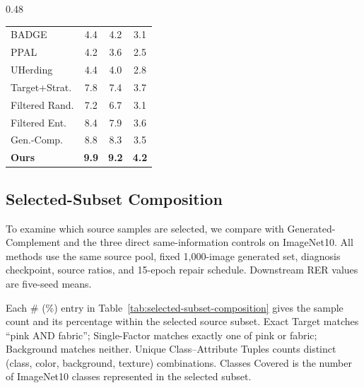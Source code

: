 \begin{table}[t]
\begin{subtable}[t]{0.48\linewidth}
\begin{tabular}{l c c c}
BADGE & 4.4 & 4.2 & 3.1 \\
PPAL & 4.2 & 3.6 & 2.5 \\
UHerding & 4.4 & 4.0 & 2.8 \\
Target+Strat. & 7.8 & 7.4 & 3.7 \\
Filtered Rand. & 7.2 & 6.7 & 3.1 \\
Filtered Ent. & 8.4 & 7.9 & 3.6 \\
Gen.-Comp. & 8.8 & 8.3 & 3.5 \\
\textbf{Ours} & \textbf{9.9} & \textbf{9.2} & \textbf{4.2} \\
\bottomrule
\end{tabular}
\end{subtable}
\end{table}

\subsection{Selected-Subset Composition}

To examine which source samples are selected, we compare \model with Generated-Complement and the three direct same-information controls on ImageNet10. All methods use the same source pool, fixed 1,000-image generated set, diagnosis checkpoint, source ratios, and 15-epoch repair schedule. Downstream RER values are five-seed means.

Each \# (\%) entry in Table~\ref{tab:selected-subset-composition} gives the sample count and its percentage within the selected source subset. Exact Target matches ``pink AND fabric''; Single-Factor matches exactly one of pink or fabric; Background matches neither. Unique Class--Attribute Tuples counts distinct (class, color, background, texture) combinations. Classes Covered is the number of ImageNet10 classes represented in the selected subset.

